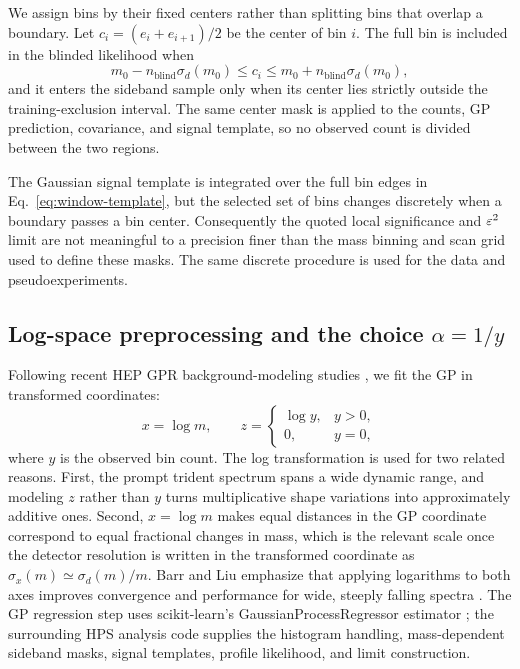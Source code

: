 We assign bins by their fixed centers rather than splitting bins that overlap a
boundary. Let $c_i=(e_i+e_{i+1})/2$ be the center of bin $i$. The full
bin is included in the blinded likelihood when
\begin{equation}
m_0-n_{\mathrm{blind}}\sigma_d(m_0)
\le c_i \le
m_0+n_{\mathrm{blind}}\sigma_d(m_0),
\end{equation}
and it enters the sideband sample only when its center lies strictly outside the
training-exclusion interval. The same center mask is applied to the counts, GP
prediction, covariance, and signal template, so no observed count is divided between
the two regions.

The Gaussian signal template is integrated over the full bin edges in
Eq.~\eqref{eq:window-template}, but the selected set of bins changes discretely when a
boundary passes a bin center. Consequently the quoted local significance and
$\varepsilon^2$ limit are not meaningful to a precision finer than the mass binning and scan
grid used to define these masks. The same discrete procedure is used for the data and
pseudoexperiments.

\subsection{Log-space preprocessing and the choice \texorpdfstring{$\alpha=1/y$}{alpha=1/y}}

Following recent HEP GPR background-modeling studies
\cite{BarrLiu2025,Gandrakota2023}, we fit the GP in transformed coordinates:
\begin{equation}
x = \log m,
\qquad
z =
\begin{cases}
\log y, & y>0, \\
0, & y=0,
\end{cases}
\end{equation}
where $y$ is the observed bin count. The log transformation is used for two related
reasons. First, the prompt trident spectrum spans a wide dynamic range, and modeling
$z$ rather than $y$ turns multiplicative shape variations into approximately additive
ones. Second, $x=\log m$ makes equal distances in the GP coordinate correspond to equal
fractional changes in mass, which is the relevant scale once the detector resolution is
written in the transformed coordinate as $\sigma_x(m)\simeq \sigma_d(m)/m$. Barr and
Liu emphasize that applying logarithms to both axes improves convergence and
performance for wide, steeply falling spectra \cite{BarrLiu2025}.
The GP regression step uses scikit-learn's GaussianProcessRegressor estimator
\cite{ScikitLearn}; the surrounding HPS analysis code supplies the histogram
handling, mass-dependent sideband masks, signal templates, profile likelihood,
and \CLs{} limit construction.

